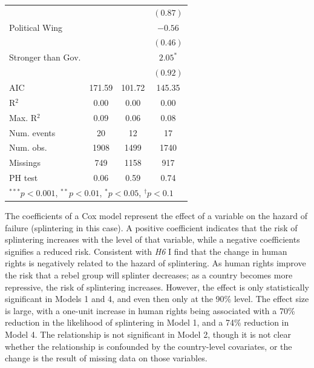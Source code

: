 \documentclass[12pt,]{book}
\let\origtable\table
\let\endorigtable\endtable
\renewenvironment{table}[1][2] {
    \singlespacing
    \expandafter\origtable\expandafter[H]
} {
    \endorigtable
}
\theoremstyle{definition}
\theoremstyle{definition}
\theoremstyle{remark}
\begin{document}
\begin{table}
\begin{center}
\begin{tabular}{l c c c }
                                  &                   &          & $(0.87)$          \\
Political Wing                    &                   &          & $-0.56$           \\
                                  &                   &          & $(0.46)$          \\
Stronger than Gov.                &                   &          & $2.05^{*}$        \\
                                  &                   &          & $(0.92)$          \\
\hline
AIC                               & 171.59            & 101.72   & 145.35            \\
R$^2$                             & 0.00              & 0.00     & 0.00              \\
Max. R$^2$                        & 0.09              & 0.06     & 0.08              \\
Num. events                       & 20                & 12       & 17                \\
Num. obs.                         & 1908              & 1499     & 1740              \\
Missings                          & 749               & 1158     & 917               \\
PH test                           & 0.06              & 0.59     & 0.74              \\
\hline
\multicolumn{4}{l}{\scriptsize{$^{***}p<0.001$, $^{**}p<0.01$, $^*p<0.05$, $^{\dagger}p<0.1$}}
\end{tabular}
\caption{Cox Proportional Hazard Models of Rebel Group Splintering}
\label{tab:survival}
\end{center}
\end{table}

The coefficients of a Cox model represent the effect of a variable on
the hazard of failure (splintering in this case). A positive coefficient
indicates that the risk of splintering increases with the level of that
variable, while a negative coefficients signifies a reduced risk.
Consistent with \emph{H6} I find that the change in human rights is
negatively related to the hazard of splintering. As human rights improve
the risk that a rebel group will splinter decreases; as a country
becomes more repressive, the risk of splintering increases. However, the
effect is only statistically significant in Models 1 and 4, and even
then only at the 90\% level. The effect size is large, with a one-unit
increase in human rights being associated with a 70\% reduction in the
likelihood of splintering in Model 1, and a 74\% reduction in Model 4.
The relationship is not significant in Model 2, though it is not clear
whether the relationship is confounded by the country-level covariates,
or the change is the result of missing data on those variables.
\end{document}
